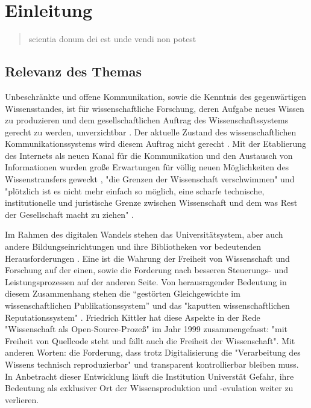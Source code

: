 \chapter{Einleitung} 
\begin{quote}
scientia donum dei est unde vendi non potest
\end{quote}

\section{Relevanz des Themas} 

Unbeschränkte und offene Kommunikation, sowie die Kenntnis des gegenwärtigen Wissensstandes, ist für wissenschaftliche Forschung, deren Aufgabe neues Wissen zu produzieren und dem gesellschaftlichen Auftrag des Wissenschaftssystems gerecht zu werden, unverzichtbar \cite{Hanekop_2014} \cite{glaeser2006} \cite{gibbons_1994} \cite{Luhmann1998}. Der aktuelle Zustand des wissenschaftlichen Kommunikationssystems wird diesem Auftrag nicht gerecht \cite{Schekman_2013}. Mit der Etablierung des Internets als neuen Kanal für die Kommunikation und den Austausch von Informationen wurden große Erwartungen für völlig neuen Möglichkeiten des Wissenstransfers geweckt \cite{Hanekop_2014} \cite{schulze_2013_open} \cite{albert_2006_open_implications} \cite{Goodrum_2001} \cite{Lawrence_1999}, "die Grenzen der Wissenschaft verschwimmen" \cite{Scheliga_2014} und "plötzlich ist es nicht mehr einfach so möglich, eine scharfe technische, institutionelle und juristische Grenze zwischen Wissenschaft und dem was Rest der Gesellschaft macht zu ziehen" \cite{kelty_2004}.

Im Rahmen des digitalen Wandels stehen das Universitätsystem, aber auch andere Bildungseinrichtungen und ihre Bibliotheken vor bedeutenden Herausforderungen \cite{Harter2006} \cite{Gu_don_2004} \cite{osterloh2008anreize}. Eine ist die Wahrung der Freiheit von Wissenschaft und Forschung auf der einen, sowie die Forderung nach besseren Steuerungs- und Leistungsprozessen \cite{Adler_2009} \cite{gibbons_1994} auf der anderen Seite. Von herausragender Bedeutung in diesem Zusammenhang stehen die “gestörten Gleichgewichte im wissenschaftlichen Publikationssystem” \cite{cite:0} und das "kaputten wissenschaftlichen Reputationssystem" \cite{suchen}. Friedrich Kittler hat diese Aspekte in der Rede "Wissenschaft als Open-Source-Prozeß" im Jahr 1999 zusammengefasst: "mit Freiheit von Quellcode steht und fällt auch die Freiheit der Wissenschaft". Mit anderen Worten: die Forderung, dass trotz Digitalisierung die "Verarbeitung des Wissens technisch reproduzierbar" \cite{cite:1} und transparent kontrollierbar \cite{suchen} bleiben muss. In Anbetracht dieser Entwicklung läuft die Institution Universtät Gefahr, ihre Bedeutung als exklusiver Ort der Wissensproduktion \cite{suchen} und -evulation \cite{suchen} weiter zu verlieren.

